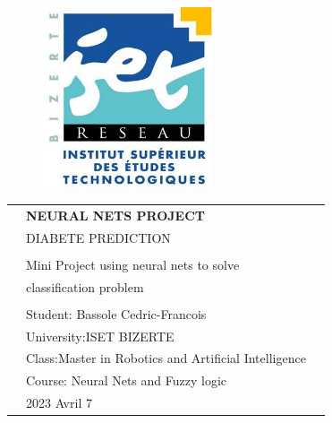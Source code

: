 \begin{center}

    \vspace*{1cm}
    
    \begin{figure}
      \raggedleft
      \begin{minipage}{4cm}
      \includegraphics[width=5cm]{images/logo-isetbz.png}
      \end{minipage}
    \end{figure}
    
    \vspace*{2cm}
    
    \vspace*{0.1in}
    
    \begin{spacing}{1.7}
    
    \begin{tabular}{p{4cm} ll}
    
    & \textbf{\huge NEURAL NETS PROJECT}\\ %
    & \Large DIABETE PREDICTION\\ %
    & \\
    & \large Mini Project using neural nets to solve \\
    & \large classification problem  \\ 
    
    & \\
    & \large Student: Bassole Cedric-Francois\\
    & \large University:ISET BIZERTE \\
    & \large Class:Master in Robotics and Artificial Intelligence \\
    & \large Course: Neural Nets and Fuzzy logic \\
    & \large 2023 Avril 7
    \end{tabular}
    
    \end{spacing}
    
    \end{center}
    
    
    
    \thispagestyle{empty} %
    \clearpage\setcounter{page}{1} %
